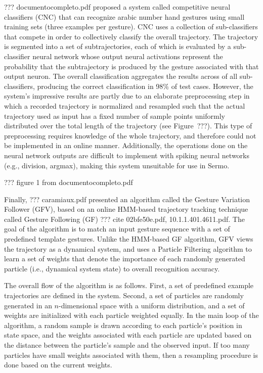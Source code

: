 ??? documentocompleto.pdf
proposed a system called competitive neural classifiers (CNC)
that can recognize arabic number hand gestures
using small training sets (three examples per gesture).
CNC uses a collection of sub-classifiers
that compete in order to collectively
classify the overall trajectory.
The trajectory is segmented
into a set of subtrajectories,
each of which is evaluated by
a sub-classifier neural network
whose output neural activations
represent the probability that
the subtrajectory is produced by
the gesture associated with that output neuron.
The overall classification aggregates the results
across of all sub-classifiers,
producing the correct classification
in 98\% of test cases.
However, the system's impressive results
are partly due to an elaborate preprocessing step
in which a recorded trajectory
is normalized and resampled
such that the actual trajectory used as input
has a fixed number of sample points
uniformly distributed over
the total length of the trajectory
(see Figure~???).
This type of preprocessing
requires knowledge of the whole trajectory,
and therefore could not be implemented
in an online manner.
Additionally, the operations done
on the neural network outputs
are difficult to implement
with spiking neural networks
(e.g., division, argmax),
making this system unsuitable
for use in Sermo.

??? figure 1 from documentocompleto.pdf

Finally,
??? caramiaux.pdf
presented an algorithm called the
Gesture Variation Follower (GFV),
based on an online HMM-based
trajectory tracking technique
called Gesture Following (GF)
??? cite 02bfe50e.pdf,
10.1.1.401.4611.pdf.
The goal of the algorithm is to match
an input gesture sequence
with a set of predefined template gestures.
Unlike the HMM-based GF algorithm,
GFV views the trajectory as a dynamical system,
and uses a Particle Filtering algorithm
to learn a set of weights
that denote the importance of
each randomly generated particle
(i.e., dynamical system state)
to overall recognition accuracy.

The overall flow of the algorithm
is as follows.
First, a set of predefined example trajectories
are defined in the system.
Second, a set of particles
are randomly generated
in an $n$-dimensional space
with a uniform distribution,
and a set of weights are initialized
with each particle weighted equally.
In the main loop of the algorithm,
a random sample is drawn
according to each particle's position
in state space,
and the weights associated with each particle
are updated based on the distance
between the particle's sample
and the observed input.
If too many particles have small weights
associated with them,
then a resampling procedure is done
based on the current weights.

